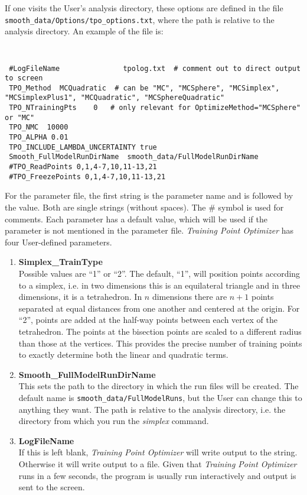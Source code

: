 \documentclass[UserManual.tex]{subfiles}
\begin{document}
If one visits the User's analysis directory, these options are defined in the file  {\tt smooth\_data/Options/tpo\_options.txt}, where the path is relative to the analysis directory. An example of the file is:
{\tt
\begin{verbatim}
 #LogFileName               tpolog.txt  # comment out to direct output to screen
 TPO_Method  MCQuadratic  # can be "MC", "MCSphere", "MCSimplex", "MCSimplexPlus1", "MCQuadratic", "MCSphereQuadratic"
 TPO_NTrainingPts    0   # only relevant for OptimizeMethod="MCSphere" or "MC"
 TPO_NMC  10000
 TPO_ALPHA 0.01
 TPO_INCLUDE_LAMBDA_UNCERTAINTY true
 Smooth_FullModelRunDirName  smooth_data/FullModelRunDirName
 #TPO_ReadPoints 0,1,4-7,10,11-13,21
 #TPO_FreezePoints 0,1,4-7,10,11-13,21
\end{verbatim}
}
For the parameter file, the first string is the parameter name and is followed by the value. Both are single strings (without spaces). The \# symbol is used for comments. Each parameter has a default value, which will be used if the parameter is not mentioned in the parameter file.  {\it Training Point Optimizer} has four User-defined parameters.
\begin{enumerate}\itemsep 0pt
    \item {\bf Simplex\_TrainType}\\
Possible values are ``1'' or ``2''. The default, ``1'', will position points according to a simplex, i.e. in two dimensions this is an equilateral triangle and in three dimensions, it is a tetrahedron. In $n$ dimensions there are $n+1$ points separated at equal distances from one another and centered at the origin. For ``2'', points are added at the half-way points between each vertex of the tetrahedron. The points at the bisection points are scaled to a different radius than those at the vertices. This provides the precise number of training points to exactly determine both the linear and quadratic terms.
\item {\bf Smooth\_FullModelRunDirName}\\
This sets the path to the directory in which the run files will be created. The default name is {\tt smooth\_data/FullModelRuns}, but the User can change this to anything they want. The path is relative to the analysis directory, i.e. the directory from which you run the {\it simplex} command.
\item {\bf LogFileName}\\
If this is left blank, {\it Training Point Optimizer} will write output to the string. Otherwise it will write output to a file. Given that {\it Training Point Optimizer} runs in a few seconds, the program is usually run interactively and output is sent to the screen.
\end{enumerate}
\end{document}
